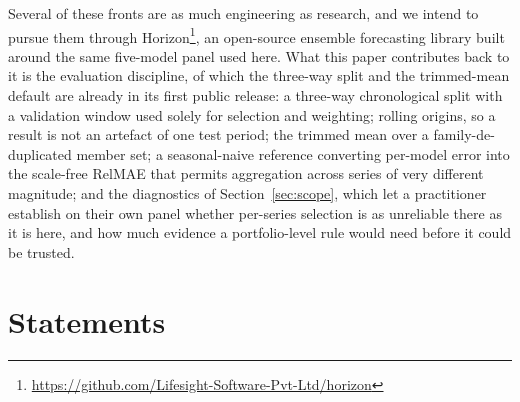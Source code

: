 \documentclass[11pt]{article}
\begin{document}
Several of these fronts are as much engineering as research, and we intend to pursue them through Horizon\footnote{\url{https://github.com/Lifesight-Software-Pvt-Ltd/horizon}}, an open-source ensemble forecasting library built around the same five-model panel used here. What this paper contributes back to it is the evaluation discipline, of which the three-way split and the trimmed-mean default are already in its first public release: a three-way chronological split with a validation window used solely for selection and weighting; rolling origins, so a result is not an artefact of one test period; the trimmed mean over a family-de-duplicated member set; a seasonal-naive reference converting per-model error into the scale-free RelMAE that permits aggregation across series of very different magnitude; and the diagnostics of Section~\ref{sec:scope}, which let a practitioner establish on their own panel whether per-series selection is as unreliable there as it is here, and how much evidence a portfolio-level rule would need before it could be trusted.

\section*{Statements}
\end{document}
